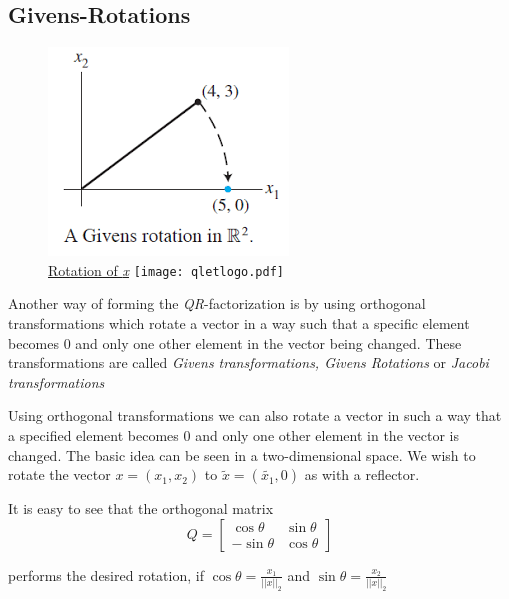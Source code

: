 \documentclass[12pt]{article}
\begin{document}
\subsection{Givens-Rotations}

\begin{figure}
\centering
\caption{\href {https://github.com/thsis/NIS18/blob/master/media/plots}{Rotation of \textit{x}}  \protect\texttt{[image: qletlogo.pdf]}}
\includegraphics[scale=0.5]{../media/plots/givens.png}
\end{figure}

Another way of forming the \textit{QR}-factorization is by using orthogonal transformations which rotate a vector in a way such that a specific element becomes 0 and only one other element in the vector being changed. These transformations are called \textit{Givens transformations, Givens Rotations} or \textit{Jacobi transformations}

Using orthogonal transformations we can also rotate a vector in such a way that a specified element becomes 0 and only one other element in the vector is changed. The basic idea can be seen in a two-dimensional space. We wish to rotate the vector $x = (x_1, x_2)$ to $\tilde{x} = (\tilde{x_1}, 0)$ as with a reflector.

It is easy to see that the orthogonal matrix 
$$Q=\begin{bmatrix}
\cos\theta & \sin\theta \\
-\sin\theta & \cos\theta
\end{bmatrix}$$

performs the desired rotation, if $\cos\theta = \frac{x_1}{||x||_2}$ and $\sin\theta = \frac{x_2}{||x||_2}$
\end{document}
